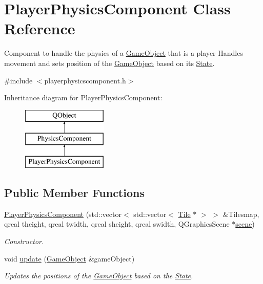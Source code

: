 \hypertarget{classPlayerPhysicsComponent}{\section{Player\-Physics\-Component Class Reference}
\label{classPlayerPhysicsComponent}
}


Component to handle the physics of a \hyperlink{classGameObject}{Game\-Object} that is a player Handles movement and sets position of the \hyperlink{classGameObject}{Game\-Object} based on its \hyperlink{classState}{State}.  




{\ttfamily \#include $<$playerphysicscomponent.\-h$>$}

Inheritance diagram for Player\-Physics\-Component\-:\begin{figure}[H]
\begin{center}
\leavevmode
\includegraphics[height=3.000000cm]{classPlayerPhysicsComponent}
\end{center}
\end{figure}
\subsection*{Public Member Functions}
\begin{DoxyCompactItemize}
\item 
\hyperlink{classPlayerPhysicsComponent_aa369c3e7e53e11bea700b75832bab9e5}{Player\-Physics\-Component} (std\-::vector$<$ std\-::vector$<$ \hyperlink{classTile}{Tile} $\ast$ $>$ $>$ \&Tilesmap, qreal theight, qreal twidth, qreal sheight, qreal swidth, Q\-Graphics\-Scene $\ast$\hyperlink{classPhysicsComponent_a838b5b49b38cfaf7a1a4b4ab2ff6accd}{scene})
\begin{DoxyCompactList}\small\item\em Constructor. \end{DoxyCompactList}\item 
void \hyperlink{classPlayerPhysicsComponent_a637c081a84bb314c6e69a50ccdcc83f4}{update} (\hyperlink{classGameObject}{Game\-Object} \&game\-Object)
\begin{DoxyCompactList}\small\item\em Updates the positions of the \hyperlink{classGameObject}{Game\-Object} based on the \hyperlink{classState}{State}. \end{DoxyCompactList}\end{DoxyCompactItemize}
